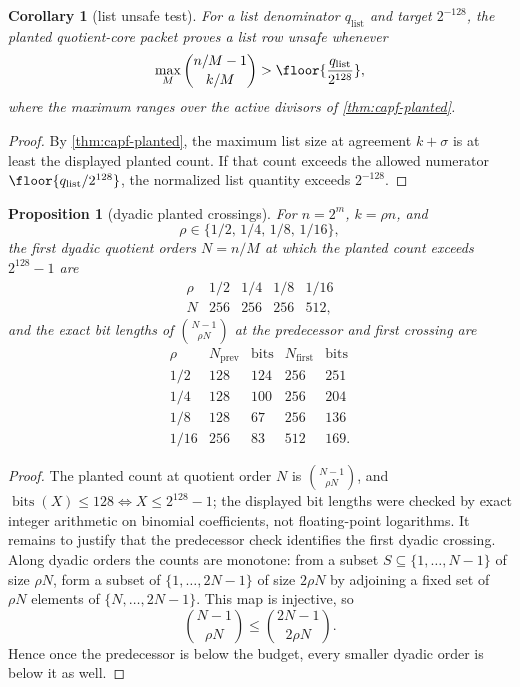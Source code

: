 \documentclass[11pt]{article}
\newtheorem{proposition}[proposition]{Proposition}
\newtheorem{corollary}[corollary]{Corollary}
\theoremstyle{definition}
\theoremstyle{remark}
\begin{document}
\begin{corollary}[list unsafe test]\label{cor:capf-list-unsafe}
For a list denominator $q_{\mathrm{list}}$ and target $2^{-128}$, the planted quotient-core packet proves a list row unsafe whenever
\[
\max_M\binom{n/M-1}{k/M}>
\floor{\frac{q_{\mathrm{list}}}{2^{128}}},
\]
where the maximum ranges over the active divisors of \cref{thm:capf-planted}.
\end{corollary}

\begin{proof}
By \cref{thm:capf-planted}, the maximum list size at agreement $k+\sigma$ is at least the displayed planted count.  If that count exceeds the allowed numerator $\floor{q_{\mathrm{list}}/2^{128}}$, the normalized list quantity exceeds $2^{-128}$.
\end{proof}

\begin{proposition}[dyadic planted crossings]\label{prop:capf-dyadic-planted}
For $n=2^m$, $k=\rho n$, and
\[
        \rho\in\{1/2,\,1/4,\,1/8,\,1/16\},
\]
the first dyadic quotient orders $N=n/M$ at which the planted count exceeds $2^{128}-1$ are
\[
\begin{array}{c|cccc}
\rho & 1/2 & 1/4 & 1/8 & 1/16\\ \hline
N & 256 & 256 & 256 & 512 ,
\end{array}
\]
and the exact bit lengths of $\binom{N-1}{\rho N}$ at the predecessor and first crossing are
\[
\begin{array}{c|cc|cc}
\rho & N_{\mathrm{prev}} & \operatorname{bits} & N_{\mathrm{first}} & \operatorname{bits}\\ \hline
1/2  & 128 & 124 & 256 & 251\\
1/4  & 128 & 100 & 256 & 204\\
1/8  & 128 &  67 & 256 & 136\\
1/16 & 256 &  83 & 512 & 169.
\end{array}
\]
\end{proposition}

\begin{proof}
The planted count at quotient order $N$ is $\binom{N-1}{\rho N}$, and $\operatorname{bits}(X)\le128\iff X\le2^{128}-1$; the displayed bit lengths were checked by exact integer arithmetic on binomial coefficients, not floating-point logarithms.  It remains to justify that the predecessor check identifies the first dyadic crossing.  Along dyadic orders the counts are monotone: from a subset $S\subseteq\{1,\ldots,N-1\}$ of size $\rho N$, form a subset of $\{1,\ldots,2N-1\}$ of size $2\rho N$ by adjoining a fixed set of $\rho N$ elements of $\{N,\ldots,2N-1\}$.  This map is injective, so
\[
        \binom{N-1}{\rho N}\le \binom{2N-1}{2\rho N}.
\]
Hence once the predecessor is below the budget, every smaller dyadic order is below it as well.
\end{proof}
\end{document}
